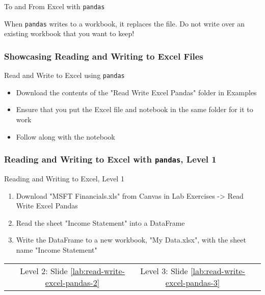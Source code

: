 \documentclass[handout, 11pt]{beamer}
\begin{document}
\begin{section}{To and From Excel with \texttt{pandas}}
\begin{frame}[fragile]
\begin{alertblock}
When
\texttt{pandas}
writes to a workbook, it replaces the file. Do not write over an existing workbook that you want to keep!
\end{alertblock}
\end{frame}
\begin{frame}
\frametitle{Showcasing Reading and Writing to Excel Files}
{
\begin{block}{Read and Write to Excel using \texttt{pandas}}
\begin{itemize}
\item Download the contents of the "Read Write Excel Pandas" folder in Examples
\item Ensure that you put the Excel file and notebook in the same folder for it to work
\item Follow along with the notebook
\end{itemize}
\end{block}
}
\end{frame}
\begin{frame}
\frametitle{Reading and Writing to Excel with \texttt{pandas}, Level 1}
{
\begin{block}{Reading and Writing to Excel, Level 1}
\begin{enumerate}
\item Download "MSFT Financials.xls" from Canvas in Lab Exercises -> Read Write Excel Pandas
\item Read the sheet "Income Statement" into a DataFrame
\item Write the DataFrame to a new workbook, "My Data.xlsx", with the sheet name "Income Statement"
\end{enumerate}
\vfill
\begin{tabular*}{\textwidth}{@{\extracolsep{\fill}}cccc}
\toprule
\hfill & Level 2: Slide \textcolor{blue}{\underline{\ref{lab:read-write-excel-pandas-2}}} & Level 3: Slide \textcolor{blue}{\underline{\ref{lab:read-write-excel-pandas-3}}} & \hfill\\

\end{tabular*}
\end{block}
}
\label{lab:read-write-excel-pandas-1}
\end{frame}
\end{section}
\end{document}
